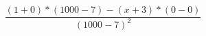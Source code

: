 \documentclass[a4paper]{article}
\begin{document}
\[
\frac{\left(1+0\right)*\left(1000-7\right)-\left(x+3\right)*\left(0-0\right)}{\left(1000-7\right)^{2}}
\]
\end{document}

